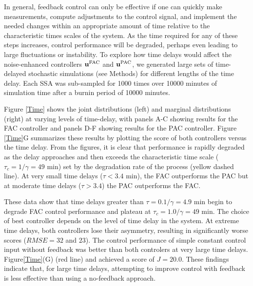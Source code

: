 \documentclass[12pt]{iopart}
\begin{document}
In general, feedback control can only be effective if one can quickly make measurements, compute adjustments to the control signal, and implement the needed changes within an appropriate amount of time relative to the characteristic times scales of the system. As the time required for any of these steps increases, control performance will be degraded, perhaps even leading to large fluctuations or instability. To explore how time delays would affect the noise-enhanced controllers $\mathbf{u}^{\rm FAC}$ and $\mathbf{u}^{\rm PAC}$, we generated large sets of time-delayed stochastic simulations (see Methods) for different lengths of the time delay. Each SSA was sub-sampled for 1000 times over 10000 minutes of simulation time after a burnin period of 10000 minutes.

Figure \ref{Time} shows the joint distributions (left) and marginal distributions (right) at varying levels of time-delay, with panels A-C showing results for the FAC controller and panels D-F showing results for the PAC controller. Figure \ref{Time}G summarizes these results by plotting the score of both controllers versus the time delay. From the figures, it is clear that performance is rapidly degraded as the delay approaches and then exceeds the characteristic time scale ($\tau_c = 1 / \gamma = 49$ min) set by the degradation rate of the process (yellow dashed line). At very small time delays ($\tau< 3.4$ min), the FAC outperforms the PAC  but at moderate time delays ($\tau > 3.4$) the PAC outperforms the FAC. 

\brian[Are these times correct?  Isn't gamma = 0.0203 in Table 1?  tau = 0.07 / 0.0203 (1/min) = 3.44 min. Please check this carefully.]
\michael[minutes]

These data show that time delays greater than $\tau = 0.1 / \gamma = 4.9$ min begin to degrade FAC control performance and plateau at $\tau_c = 1.0 / \gamma = 49$ min.   The choice of best controller depends on the level of time delay in the system. At extreme time delays, both controllers lose their asymmetry, resulting in significantly worse scores ($RMSE = 32$ and $23$). The control performance of simple constant control input without feedback was better than both controlers at very large time delays. Figure\ref{Time}(G) (red line) and achieved a score of $J = 20.0$. These findings indicate that, for large time delays, attempting to improve control with feedback is less effective than using a no-feedback approach.
\end{document}
